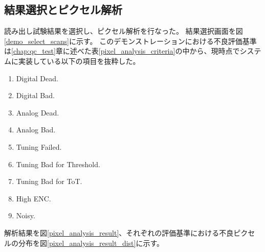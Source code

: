 \clearpage
\subsection{結果選択とピクセル解析}
読み出し試験結果を選択し、ピクセル解析を行なった。
結果選択画面を図\ref{demo_select_scans}に示す。
このデモンストレーションにおける不良評価基準は\ref{chap:qc_test}章に述べた表\ref{pixel_analysis_criteria}の中から、現時点でシステムに実装している以下の項目を抜粋した。
\begin{enumerate}
  \item Digital Dead. 
  \item Digital Bad.
  \item Analog Dead. 
  \item Analog Bad. 
  \item Tuning Failed.
  \item Tuning Bad for Threshold.
  \item Tuning Bad for ToT.
  \item High ENC.
  \item Noisy.
\end{enumerate}

解析結果を図\ref{pixel_analysis_result}、それぞれの評価基準における不良ピクセルの分布を図\ref{pixel_analysis_result_dist}に示す。

